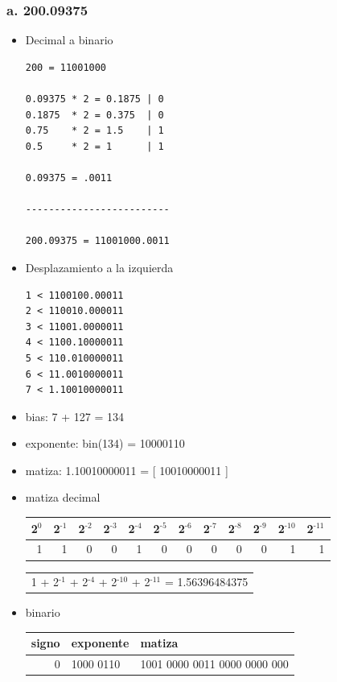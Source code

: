 \documentclass[12pt]{article}
\begin{document}
\subsubsection*{a. 200.09375}
\label{sec:orgced60d5}
\begin{itemize}
\item Decimal a binario
\label{sec:org94d7b76}
\begin{verbatim}
200 = 11001000

0.09375 * 2 = 0.1875 | 0
0.1875  * 2 = 0.375  | 0
0.75    * 2 = 1.5    | 1
0.5     * 2 = 1      | 1

0.09375 = .0011

-------------------------

200.09375 = 11001000.0011
\end{verbatim}

\item Desplazamiento a la izquierda
\label{sec:org3203a6b}
\begin{verbatim}
1 < 1100100.00011
2 < 110010.000011
3 < 11001.0000011
4 < 1100.10000011
5 < 110.010000011
6 < 11.0010000011
7 < 1.10010000011
\end{verbatim}

\item bias:
\label{sec:orgbd4d9a5}
7 + 127 = 134

\item exponente:
\label{sec:org2787ed3}
bin(134) = 10000110 

\item matiza:
\label{sec:orgadf205b}
1.10010000011 = [ 10010000011 ]

\item matiza decimal
\label{sec:org2429610}
\begin{center}
\begin{tabular}{rrrrrrrrrrrr}
\hline
2\(^{\text{0}}\) & 2\(^{\text{-1}}\) & 2\(^{\text{-2}}\) & 2\(^{\text{-3}}\) & 2\(^{\text{-4}}\) & 2\(^{\text{-5}}\) & 2\(^{\text{-6}}\) & 2\(^{\text{-7}}\) & 2\(^{\text{-8}}\) & 2\(^{\text{-9}}\) & 2\(^{\text{-10}}\) & 2\(^{\text{-11}}\)\\
\hline
1 & 1 & 0 & 0 & 1 & 0 & 0 & 0 & 0 & 0 & 1 & 1\\
\hline
\end{tabular}
\end{center}

\begin{center}
\begin{tabular}{l}
1 + 2\(^{\text{-1}}\) + 2\(^{\text{-4}}\) + 2\(^{\text{-10}}\) + 2\(^{\text{-11}}\) = 1.56396484375\\
\end{tabular}
\end{center}

\item binario
\label{sec:orgf81b226}
\begin{center}
\begin{tabular}{rll}
\hline
signo & exponente & matiza\\
\hline
0 & 1000 0110 & 1001 0000 0011 0000 0000 000\\
\hline
\end{tabular}
\end{center}
\end{itemize}
\end{document}
